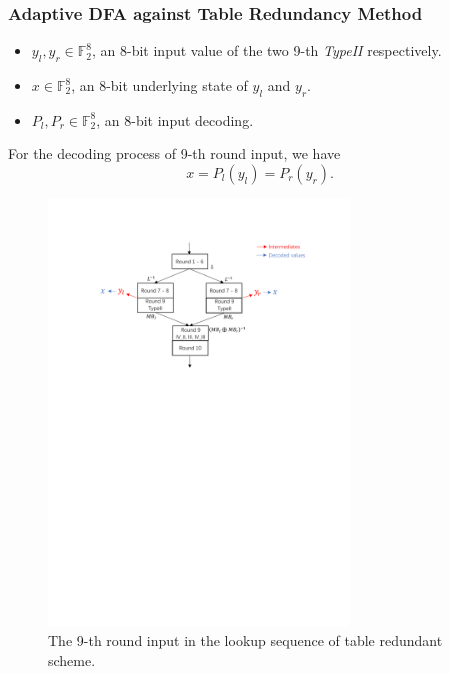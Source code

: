 \documentclass{beamer}
\begin{document}

\frame
{
	\frametitle{Adaptive DFA against Table Redundancy Method}
	\begin{itemize}
		\item $y_{l}, y_{r} \in \mathbb{F}_{2}^{8}$, an 8-bit input value of the two 9-th \textit{TypeII} respectively.
		\item $x \in \mathbb{F}_{2}^{8}$, an 8-bit underlying state of $y_{l}$ and $y_{r}$.
		\item $P_{l}, P_{r} \in \mathbb{F}_{2}^{8}$, an 8-bit input decoding.
	\end{itemize}
	For the decoding process of 9-th round input, we have
	\[x = P_{l}(y_{l}) = P_{r}(y_{r}).\]
}

\frame
{
	\begin{figure}
		\centering
		\includegraphics[width=8cm]{./pics/TRS2.pdf}
		\caption{The 9-th round input in the lookup sequence of table redundant scheme.}
	\end{figure}
}
\end{document}
